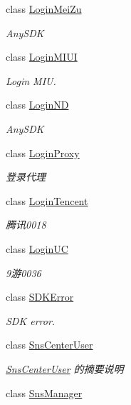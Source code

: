 \begin{DoxyCompactItemize}
class \mbox{\hyperlink{class_t_net_1_1_sns_1_1_login_mei_zu}{Login\+Mei\+Zu}}
\begin{DoxyCompactList}\small\item\em Any\+S\+DK \end{DoxyCompactList}\item 
class \mbox{\hyperlink{class_t_net_1_1_sns_1_1_login_m_i_u_i}{Login\+M\+I\+UI}}
\begin{DoxyCompactList}\small\item\em Login M\+IU. \end{DoxyCompactList}\item 
class \mbox{\hyperlink{class_t_net_1_1_sns_1_1_login_n_d}{Login\+ND}}
\begin{DoxyCompactList}\small\item\em Any\+S\+DK \end{DoxyCompactList}\item 
class \mbox{\hyperlink{class_t_net_1_1_sns_1_1_login_proxy}{Login\+Proxy}}
\begin{DoxyCompactList}\small\item\em 登录代理 \end{DoxyCompactList}\item 
class \mbox{\hyperlink{class_t_net_1_1_sns_1_1_login_tencent}{Login\+Tencent}}
\begin{DoxyCompactList}\small\item\em 腾讯0018 \end{DoxyCompactList}\item 
class \mbox{\hyperlink{class_t_net_1_1_sns_1_1_login_u_c}{Login\+UC}}
\begin{DoxyCompactList}\small\item\em 9游0036 \end{DoxyCompactList}\item 
class \mbox{\hyperlink{class_t_net_1_1_sns_1_1_s_d_k_error}{S\+D\+K\+Error}}
\begin{DoxyCompactList}\small\item\em S\+DK error. \end{DoxyCompactList}\item 
class \mbox{\hyperlink{class_t_net_1_1_sns_1_1_sns_center_user}{Sns\+Center\+User}}
\begin{DoxyCompactList}\small\item\em \mbox{\hyperlink{class_t_net_1_1_sns_1_1_sns_center_user}{Sns\+Center\+User}} 的摘要说明 \end{DoxyCompactList}\item 
class \mbox{\hyperlink{class_t_net_1_1_sns_1_1_sns_manager}{Sns\+Manager}}

\end{DoxyCompactItemize}
